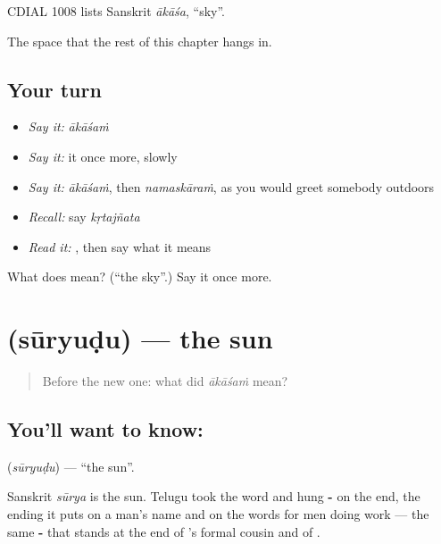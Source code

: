 CDIAL 1008 lists Sanskrit \emph{ākāśa}, \textquotedblleft{}sky\textquotedblright{}.

\begin{grammarlens}[title={What you've built}]
The space that the rest of this chapter hangs in.
\end{grammarlens}

\subsection*{Your turn}
\begin{itemize}
\raggedright
  \item \emph{Say it:} \emph{ākāśaṁ}
  \item \emph{Say it:} it once more, slowly
  \item \emph{Say it:} \emph{ākāśaṁ}, then \emph{namaskāraṁ}, as you would greet somebody outdoors
  \item \emph{Recall:} say \emph{kṛtajñata}
  \item \emph{Read it:} \textbf{}, then say what it means
\end{itemize}

\begin{tcolorbox}[breakable,colback=teal!4,colframe=teal!35!black,title={Before you move on}]
What does  mean? (\textquotedblleft{}the sky\textquotedblright{}.) Say it once more.
\end{tcolorbox}
\section[\texorpdfstring{\te{సూర్యుడు} (sūryuḍu)}{సూర్యుడు (sūryuḍu)}]{ (sūryuḍu) — the sun}

\label{lesson:TE-C53-sun}



\begin{quote}
Before the new one: what did \emph{ākāśaṁ} mean?
\end{quote}

\subsection*{You'll want to know: }
\textbf{} (\emph{sūryuḍu}) — \textquotedblleft{}the sun\textquotedblright{}.

Sanskrit \emph{sūrya} is the sun. Telugu took the word and hung \textbf{-} on the end, the ending it puts on a man's name and on the words for men doing work — the same \textbf{-} that stands at the end of 's formal cousin and of .

